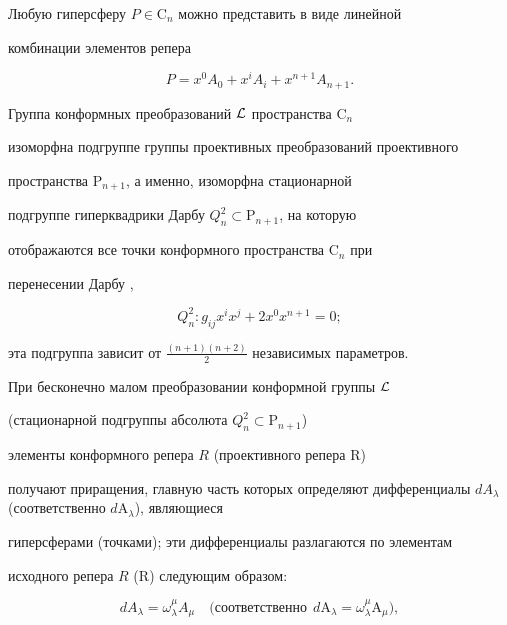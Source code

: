  


Любую гиперсферу $P\in\mathrm C_n$ можно представить в виде линейной 


комбинации элементов репера


$$ 


P=x^0A_0+x^i A_i+x^{n+1}A_{n+1}. 


$$ 


 


Группа конформных преобразований $\cal L$ пространства $\mathrm C_n$ 


изоморфна подгруппе группы проективных преобразований проективного 


пространства $\mathrm P_{n+1}$, а именно, изоморфна стационарной 


подгруппе гиперквадрики Дарбу $Q^2_n\subset\mathrm P_{n+1}$, на которую 


отображаются все точки конформного пространства $\mathrm C_n$ при 


перенесении Дарбу \cite{1}, \cite{2}


$$ 


Q^2_n:g_{i j}x^i x^j+2x^0x^{n+1}=0; 


$$ 


эта подгруппа зависит от $\frac{(n+1)(n+2)}{2}$ независимых параметров. 


 


При бесконечно малом преобразовании конформной группы $\cal L$ 


(стационарной подгруппы абсолюта $Q^2_n\subset\mathrm P_{n+1}$) 


элементы конформного репера $R$ (проективного репера $\mathrm R$) 


получают приращения, главную часть которых определяют дифференциалы $d 


A_\lambda$ (соответственно $d\mathrm A_\lambda$), являющиеся 


гиперсферами (точками); эти дифференциалы разлагаются по элементам 


исходного репера $R$ ($\mathrm R$) следующим образом: 


\begin{equation} 


d A_\lambda=\omega^\mu_\lambda A_\mu\quad 


\text{(соответственно}\ \ d\mathrm A_\lambda=\omega^\mu_\lambda 


\mathrm A_\mu), 


\end{equation} 


